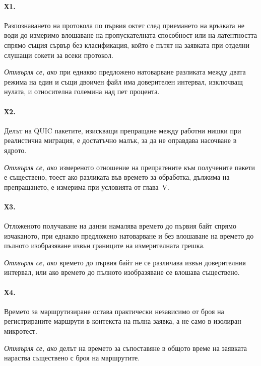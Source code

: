 \paragraph{Х1.} Разпознаването на протокола по първия октет след приемането на връзката не
води до измеримо влошаване на пропускателната способност или на латентността спрямо същия
сървър без класификация, който е пътят на заявката при отделни слушащи сокети за всеки
протокол.

\emph{Отхвърля се, ако} при еднакво предложено натоварване разликата между двата режима на
един и същи двоичен файл има доверителен интервал, изключващ нулата, и относителна големина
над пет процента.

\paragraph{Х2.} Делът на QUIC пакетите, изискващи препращане между работни нишки при
реалистична миграция, е достатъчно малък, за да не оправдава насочване в ядрото.

\emph{Отхвърля се, ако} измереното отношение на препратените към получените пакети е
съществено, тоест ако разликата във времето за обработка, дължима на препращането, е
измерима при условията от глава~V.

\paragraph{Х3.} Отложеното получаване на данни намалява времето до първия байт спрямо
изчаканото, при еднакво предложено натоварване и без влошаване на времето до пълното
изобразяване извън границите на измерителната грешка.

\emph{Отхвърля се, ако} времето до първия байт не се различава извън доверителния интервал,
или ако времето до пълното изобразяване се влошава съществено.

\paragraph{Х4.} Времето за маршрутизиране остава практически независимо от броя на
регистрираните маршрути в контекста на пълна заявка, а не само в изолиран микротест.

\emph{Отхвърля се, ако} делът на времето за съпоставяне в общото време на заявката нараства
съществено с броя на маршрутите.

\subsection{}


